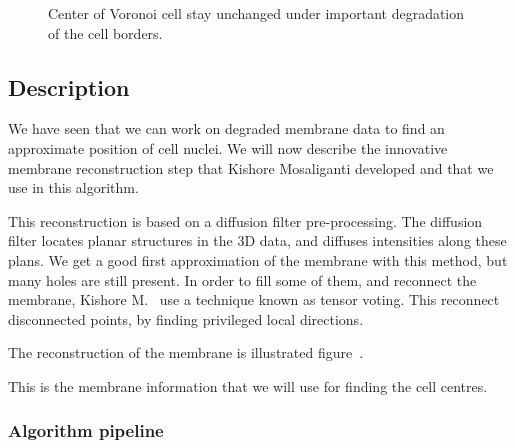 \begin{figure}[h]
\caption{Center of Voronoi cell stay unchanged under important degradation of the cell borders.}
  \label{fig:incompleteMembraneSynthetic}
\end{figure}



\subsection{Description}
We have seen that we can work on degraded membrane data to find an approximate position of cell nuclei.
We will now describe the innovative membrane reconstruction step that Kishore Mosaliganti developed and that we use in this algorithm.


This reconstruction is based on a diffusion filter pre-processing. The diffusion filter locates planar structures in the 3D data, and diffuses intensities along these plans.
We get a good first approximation of the membrane with this method, but many holes are still present.
In order to fill some of them, and reconnect the membrane, Kishore M.~{\etal} use a technique known as tensor voting.
This reconnect disconnected points, by finding privileged local directions.

The reconstruction of the membrane is illustrated figure~.

This is the membrane information that we will use for finding the cell centres.







\subsubsection{Algorithm pipeline}

